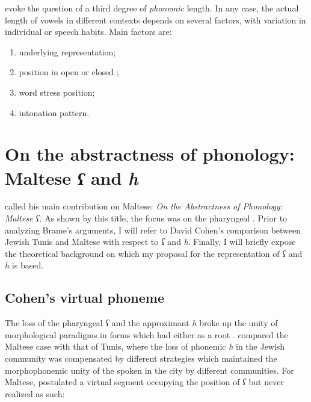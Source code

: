 \documentclass[output=paper]{langsci/langscibook}
\begin{document}
\citet[42]{Hume2009} evoke the question of a third degree of \textit{phonemic} length.
In any case, the actual length of vowels in different contexts depends on several factors, with variation in individual or  speech habits. Main factors are:

\begin{enumerate}
\item underlying representation;
\item position in open or closed ;
\item word stress position;
\item intonation pattern.
\end{enumerate}


\section{On the abstractness of phonology: Maltese \textit{ʕ} and \textit{h}}\label{sec:puech:6}

\citet{Brame1972} called his main contribution on Maltese: \textit{On the Abstractness of Phonology: Maltese ʕ.} As shown by this title, the focus was on the pharyngeal . Prior to analyzing Brame's arguments, I will refer to David Cohen's comparison between Jewish Tunis  and Maltese with respect to \textit{ʕ} and \textit{h}. Finally, I will briefly expose the theoretical background on which my proposal for the representation of \textit{ʕ} and \textit{h} is based.

\subsection{Cohen's virtual phoneme}
The loss of the pharyngeal  \textit{ʕ} and the approximant \textit{h} broke up the unity of morphological paradigms in forms which had either  as a root . \citet{Cohen1966,Cohen1970} compared the Maltese case with that of Tunis, where the loss of phonemic \textit{h} in the Jewish community was compensated by different strategies which maintained the morphophonemic unity of the   spoken in the city by different communities. For Maltese, \citet[131]{Cohen1970} postulated a virtual segment occupying the position of \textit{ʕ} but never realized as such:
\end{document}
